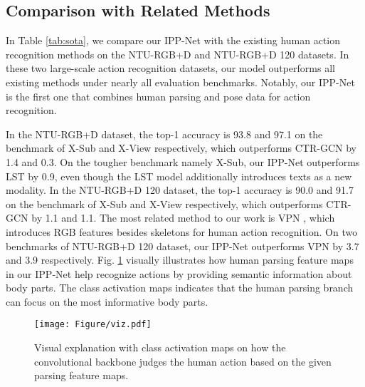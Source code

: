 \documentclass[runningheads]{llncs}
\begin{document}
\subsection{Comparison with Related Methods}
In Table \ref{tab:sota}, we compare our IPP-Net with the existing human action recognition methods on the NTU-RGB+D and NTU-RGB+D 120 datasets. In these two large-scale action recognition datasets, our model outperforms all existing methods under nearly all evaluation benchmarks. Notably, our IPP-Net is the first one that combines human parsing and pose data for action recognition. 

In the NTU-RGB+D dataset, the top-1 accuracy is 93.8 and 97.1 on the benchmark of X-Sub and X-View respectively, which outperforms CTR-GCN \cite{CTR-GCN2021} by 1.4 and 0.3. On the tougher benchmark namely X-Sub, our IPP-Net outperforms LST \cite{LST2022} by 0.9, even though the LST model additionally introduces texts as a new modality. In the NTU-RGB+D 120 dataset, the top-1 accuracy is 90.0 and 91.7 on the benchmark of X-Sub and X-View respectively, which outperforms CTR-GCN by 1.1 and 1.1. The most related method to our work is VPN \cite{vpn2020}, which introduces RGB features besides skeletons for human action recognition. On two benchmarks of NTU-RGB+D 120 dataset, our IPP-Net outperforms VPN by 3.7 and 3.9 respectively. Fig. \ref{viz} visually illustrates how human parsing feature maps in our IPP-Net help recognize actions by providing semantic information about body parts. The class activation maps indicates that the human parsing branch can focus on the most informative body parts.

\begin{figure}[t]
    \texttt{[image: Figure/viz.pdf]}
    \caption{Visual explanation with class activation maps on how the convolutional backbone judges the human action based on the given parsing feature maps.} 
    \label{viz}
\end{figure}
\end{document}
